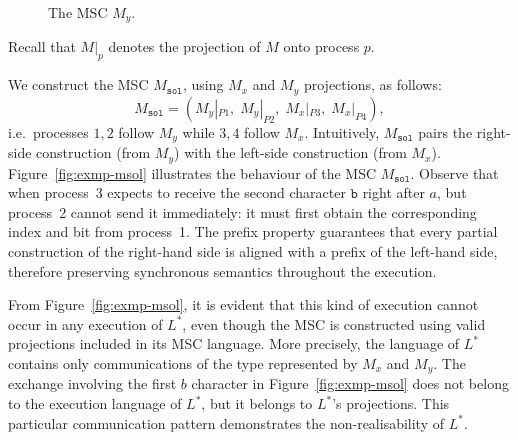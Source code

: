 \begin{example}
\begin{figure}[!ht]
\centering
\begin{msc}[draw frame=none, draw head=none, msc keyword=, head height=0px, label distance=0.5ex, foot height=0px, foot distance=0px]{}



\end{msc}
\caption{The MSC $M_y$.}
\label{fig:exmp-my}
\end{figure}

Recall that $M|_p$ denotes the projection of $M$ onto process $p$. 

We construct the MSC $M_{\texttt{sol}}$, using $M_x$ and $M_y$ projections, as follows:
$$
  M_{\texttt{sol}} = (M_y|_{P1},\; M_y|_{P2},\; M_x|_{P3},\; M_x|_{P4}),
$$
i.e.\ processes $1,2$ follow $M_y$ while $3,4$ follow $M_x$.
Intuitively, $M_{\texttt{sol}}$ pairs the right-side construction (from $M_y$)
with the left-side construction (from $M_x$). 
Figure~\ref{fig:exmp-msol} illustrates the behaviour of the MSC
$M_{\texttt{sol}}$. Observe that when process~3 expects to receive the
second character $\texttt{b}$ right after $a$, 
but process~2 cannot send it immediately:
it must first obtain the corresponding index and bit from process~1.
The prefix property guarantees
that every partial construction of the right-hand side is aligned with
a prefix of the left-hand side, therefore preserving synchronous
semantics throughout the execution.

From Figure~\ref{fig:exmp-msol}, it is evident that this kind of execution 
cannot occur in any execution of $L^*$, even though the MSC is constructed 
using valid projections included in its MSC language. 
More precisely, the language of $L^*$ contains only communications 
of the type represented by $M_x$ and $M_y$. 
The exchange involving the first $b$ character in Figure~\ref{fig:exmp-msol} 
does not belong to the execution language of $L^*$, but it belongs to
$L^*$'s projections. 
This particular communication pattern demonstrates 
the non-realisability of $L^*$.



\end{example}
